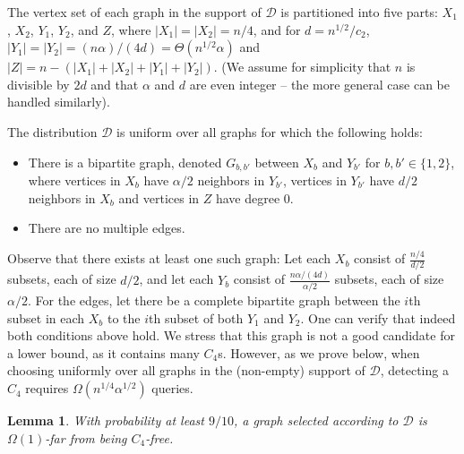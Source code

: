 \documentclass{article}
\newcommand{\calD}{{\mathcal{D}}}
\newtheorem{lemma}{Lemma}
\newcommand{\commentt}[1]{ {}}
\begin{document}
The vertex set of each graph in the support of $\calD$ is partitioned into five parts: $X_1$, $X_2$, $Y_1$, $Y_2$, and $Z$, where $|X_1| = |X_2|=n/4$, and for $d = n^{1/2}/c_2$,  $|Y_1| = |Y_2| = (n\alpha)/(4 d) = \Theta(n^{1/2}\alpha)$ and $|Z| = n - (|X_1|+|X_2|+|Y_1|+|Y_2|)$. (We assume for simplicity that $n$ is divisible by $2d$
and that $\alpha$ and $d$ are even integer -- the more general case can be handled similarly). %


The distribution $\calD$ is uniform over all graphs for which the following holds:
\begin{itemize}
\item There is a bipartite graph, denoted $G_{b,b'}$ between $X_b$ and $Y_{b'}$ for $b,b' \in \{1,2\}$, where vertices in $X_b$ have  $\alpha/2$ neighbors in $Y_{b'}$, vertices in $Y_{b'}$ have $d/2$ neighbors in $X_b$ and vertices in $Z$ have degree $0$.
\item There are no multiple edges.
\end{itemize}
 Observe that there exists at least one such graph: Let each $X_b$  consist of $\frac{n/4}{d/2}$ subsets, each of size $d/2$, and let each $Y_b$ consist of $\frac{n\alpha/(4d)}{\alpha/2}$ subsets, each of size $\alpha/2$. For the edges, let there be a complete bipartite graph between the $i$th subset in each $X_b$ to the $i$th subset of both $Y_1$ and $Y_2$. One can verify that indeed both conditions above hold. We stress that this graph is not a good candidate for a lower bound, as it contains many $C_4$s. However, as we prove below, when choosing uniformly over all graphs in the (non-empty) support of $\calD$, detecting a $C_4$ requires $\Omega(n^{1/4}\alpha^{1/2})$ queries.


 \begin{lemma}\label{lem:D-C4-far}
With probability at least $9/10$, a graph selected according to $\calD$ is $\Omega(1)$-far from being $C_4$-free.
\end{lemma}
\end{document}
